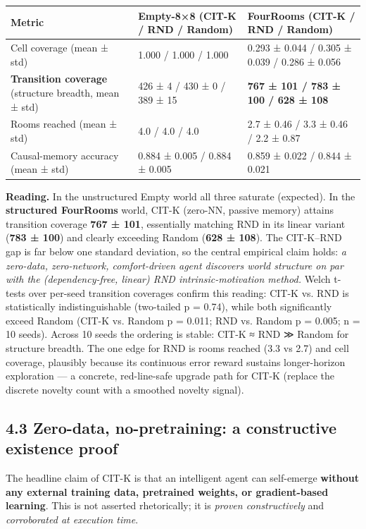\documentclass[11pt]{article}
\begin{document}
\begin{table}[ht]\centering
\begin{tabular}{lll}
\toprule
Metric & Empty-8×8 (CIT-K / RND / Random) & FourRooms (CIT-K / RND / Random) \\
\midrule
Cell coverage (mean ± std) & 1.000 / 1.000 / 1.000 & 0.293 ± 0.044 / 0.305 ± 0.039 / 0.286 ± 0.056 \\
\textbf{Transition coverage} (structure breadth, mean ± std) & 426 ± 4 / 430 ± 0 / 389 ± 15 & \textbf{767 ± 101 / 783 ± 100 / 628 ± 108} \\
Rooms reached (mean ± std) & 4.0 / 4.0 / 4.0 & 2.7 ± 0.46 / 3.3 ± 0.46 / 2.2 ± 0.87 \\
Causal-memory accuracy (mean ± std) & 0.884 ± 0.005 / 0.884 ± 0.005 & 0.859 ± 0.022 / 0.844 ± 0.021 \\
\bottomrule
\end{tabular}
\end{table}

\textbf{Reading.} In the unstructured Empty world all three saturate (expected). In the \textbf{structured FourRooms} world, CIT-K (zero-NN, passive memory) attains transition coverage \textbf{767 ± 101}, essentially matching RND in its linear variant (\textbf{783 ± 100}) and clearly exceeding Random (\textbf{628 ± 108}). The CIT-K–RND gap is far below one standard deviation, so the central empirical claim holds: \emph{a zero-data, zero-network, comfort-driven agent discovers world structure on par with the (dependency-free, linear) RND intrinsic-motivation method.} Welch t-tests over per-seed transition coverages confirm this reading: CIT-K vs. RND is statistically indistinguishable (two-tailed p = 0.74), while both significantly exceed Random (CIT-K vs. Random p = 0.011; RND vs. Random p = 0.005; n = 10 seeds). Across 10 seeds the ordering is stable: CIT-K ≈ RND ≫ Random for structure breadth. The one edge for RND is rooms reached (3.3 vs 2.7) and cell coverage, plausibly because its continuous error reward sustains longer-horizon exploration — a concrete, red-line-safe upgrade path for CIT-K (replace the discrete novelty count with a smoothed novelty signal).

\subsection{4.3 Zero-data, no-pretraining: a constructive existence proof}

The headline claim of CIT-K is that an intelligent agent can self-emerge \textbf{without any external training data, pretrained weights, or gradient-based learning}. This is not asserted rhetorically; it is \emph{proven constructively} and \emph{corroborated at execution time}.
\end{document}
